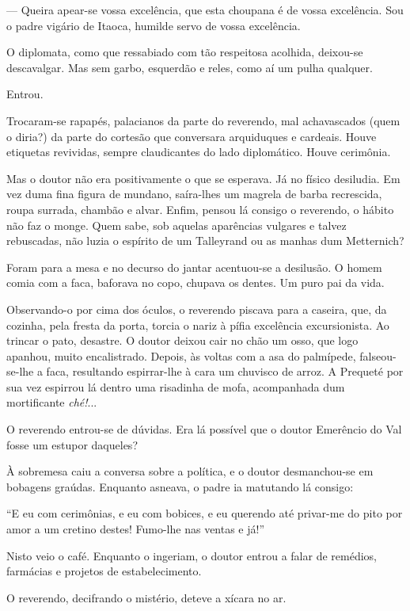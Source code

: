 --- Queira apear-se vossa excelência, que esta choupana é de vossa
excelência. Sou o padre vigário de Itaoca, humilde servo de vossa
excelência.

O diplomata, como que ressabiado com tão respeitosa acolhida, deixou-se
descavalgar. Mas sem garbo, esquerdão e reles, como aí um pulha
qualquer.

Entrou.

Trocaram-se rapapés, palacianos da parte do reverendo, mal achavascados
(quem o diria?) da parte do cortesão que conversara arquiduques e
cardeais. Houve etiquetas revividas, sempre claudicantes do lado
diplomático. Houve cerimônia.

Mas o doutor não era positivamente o que se esperava. Já no físico
desiludia. Em vez duma fina figura de mundano, saíra-lhes um magrela de
barba recrescida, roupa surrada, chambão e alvar. Enfim, pensou lá
consigo o reverendo, o hábito não faz o monge. Quem sabe, sob aquelas
aparências vulgares e talvez rebuscadas, não luzia o espírito de um
Talleyrand ou as manhas dum Metternich?

Foram para a mesa e no decurso do jantar acentuou-se a desilusão. O
homem comia com a faca, baforava no copo, chupava os dentes. Um puro pai
da vida.

Observando-o por cima dos óculos, o reverendo piscava para a caseira,
que, da cozinha, pela fresta da porta, torcia o nariz à pífia excelência
excursionista. Ao trincar o pato, desastre. O doutor deixou cair no chão
um osso, que logo apanhou, muito encalistrado. Depois, às voltas com a
asa do palmípede, falseou-se-lhe a faca, resultando espirrar-lhe à cara
um chuvisco de arroz. A Prequeté por sua vez espirrou lá dentro uma
risadinha de mofa, acompanhada dum mortificante \emph{ché!}...

O reverendo entrou-se de dúvidas. Era lá possível que o doutor Emerêncio
do Val fosse um estupor daqueles?

À sobremesa caiu a conversa sobre a política, e o doutor desmanchou-se
em bobagens graúdas. Enquanto asneava, o padre ia matutando lá consigo:

``E eu com cerimônias, e eu com bobices, e eu querendo até privar-me do
pito por amor a um cretino destes! Fumo-lhe nas ventas e já!''

Nisto veio o café. Enquanto o ingeriam, o doutor entrou a falar de
remédios, farmácias e projetos de estabelecimento.

O reverendo, decifrando o mistério, deteve a xícara no ar.

